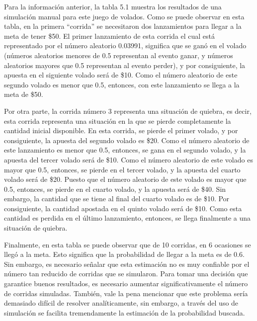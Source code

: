\documentclass[11pt,letterpaper]{report}
\begin{document}
Para la información anterior, la tabla 5.1 muestra los resultados de una
simulación manual para este juego de volados. Como se puede observar en
esta tabla, en la primera ``corrida'' se necesitaron dos lanzamientos
para llegar a la meta de tener \$50. El primer lanzamiento de esta corrida
el cual está representado por el número aleatorio 0.03991, significa que
se ganó en el volado (números aleatorios menores de 0.5 representan al
evento ganar, y números aleatorios mayores que 0.5 representan al evento
perder), y por consiguiente, la apuesta en el siguiente volado será de
\$10. Como el número aleatorio de este segundo volado es menor que 0.5,
entonces, con este lanzamiento se llega a la meta de \$50.

Por otra parte, la corrida número 3 representa una situación de quiebra,
es decir, esta corrida representa una situación en la que se pierde
completamente la cantidad inicial disponible. En esta corrida, se pierde
el primer volado, y por consiguiente, la apuesta del segundo volado es
\$20. Como el número aleatorio de este lanzamiento es menor que 0.5,
entonces, se gana en el segundo volado, y la apuesta del tercer volado
será de \$10. Como el número aleatorio de este volado es mayor que 0.5,
entonces, se pierde en el tercer volado, y la apuesta del cuarto volado
será de \$20. Puesto que el número aleatorio de este volado es mayor que
0.5, entonces, se pierde en el cuarto volado, y la apuesta será de \$40.
Sin embargo, la cantidad que se tiene al final del cuarto volado es de
\$10. Por consiguiente, la cantidad apostada en el quinto volado será de
\$10. Como esta cantidad es perdida en el último lanzamiento, entonces, se
llega finalmente a una situación de quiebra.

Finalmente, en esta tabla se puede observar que de 10 corridas, en 6
ocasiones se llegó a la meta. Esto significa que la probabilidad de llegar
a la meta es de 0.6. Sin embargo, es necesario señalar que esta estimación
no es muy confiable por el número tan reducido de corridas que se
simularon. Para tomar una decisión que garantice buenos resultados, es
necesario aumentar significativamente el número de corridas simuladas.
También, vale la pena mencionar que este problema sería demasiado difícil
de resolver analíticamente, sin embargo, a través del uso de simulación se
facilita tremendamente la estimación de la probabilidad buscada.
\end{document}
